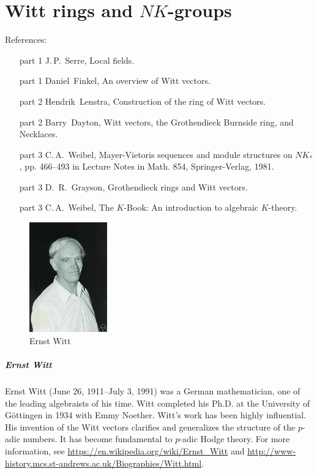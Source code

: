 \chapter{Witt rings and $NK$-groups}
References:
\begin{itemize}
    \item[part 1] J.\,P.\ Serre, Local fields.
    \item[part 1] Daniel\ Finkel, An overview of Witt vectors.
    \item[part 2] Hendrik\ Lenstra, Construction of the ring of Witt vectors.
    \item[part 2] Barry\ Dayton, Witt vectors, the Grothendieck Burnside ring, and Necklaces.
	\item[part 3] C.\,A.\ Weibel, Mayer-Vietoris sequences and module structures on $NK_*$, pp. 466–493 in Lecture Notes in Math. 854, Springer-Verlag, 1981.
	\item[part 3] D.\, R.\ Grayson, Grothendieck rings and Witt vectors.
	\item[part 3] C.\,A.\ Weibel, The $K$-Book: An introduction to algebraic $K$-theory.
\end{itemize}
\begin{figure}[htbp]
	\centering
	\includegraphics[width=0.3\textwidth]{Witt.jpeg}
	\caption{Ernst Witt}
\end{figure}
\paragraph{Ernst Witt} %
\label{par:ernst_witt}
Ernst Witt (June 26, 1911--July 3, 1991) was a German mathematician, one of the leading algebraists of his time. Witt completed his Ph.D. at the University of G\"{o}ttingen in 1934 with Emmy Noether. Witt's work has been highly influential. His invention of the Witt vectors clarifies and generalizes the structure of the $p$-adic numbers. It has become fundamental to $p$-adic Hodge theory. For more information, see \url{https://en.wikipedia.org/wiki/Ernst_Witt} and \url{http://www-history.mcs.st-andrews.ac.uk/Biographies/Witt.html}.


